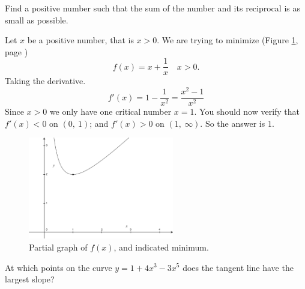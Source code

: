 \documentclass[12pt,addpoints, answers, fleqn]{exam}
\begin{document}
\begin{questions}

\question Find a positive number such that the sum of the number and its reciprocal is as small as possible.

\begin{solution}
Let $x$ be a positive number, that is $x > 0$. We are trying to minimize (Figure \ref{fig:graph2403}, page \pageref{fig:graph2403})
\[
f\left( x \right) = x + \frac{1}{x} \quad x > 0.
\]
Taking the derivative.
\[
f'\left( x \right) = 1 - \frac{1}{x^2} = \frac{x^2-1}{x^2}
\]
Since $x>0$ we only have one critical number $x=1$. You should now verify that $f'\left( x \right) < 0$ on $\left( 0, \ 1 \right)$; and $f'\left( x \right) > 0$ on $\left( 1, \ \infty \right)$. So the answer is $1$.
\end{solution}
\begin{figure}[htbp] %
   \centering
   \includegraphics[width=2.5in]{./graphics/graph2403.pdf} 
   \caption{Partial graph of $f\left( x \right)$, and indicated minimum.}
   \label{fig:graph2403}
\end{figure}


\question At which points on the curve $y = 1 + 4x^3 - 3x^5$ does the tangent line have the largest slope?


\end{questions}
\end{document}
